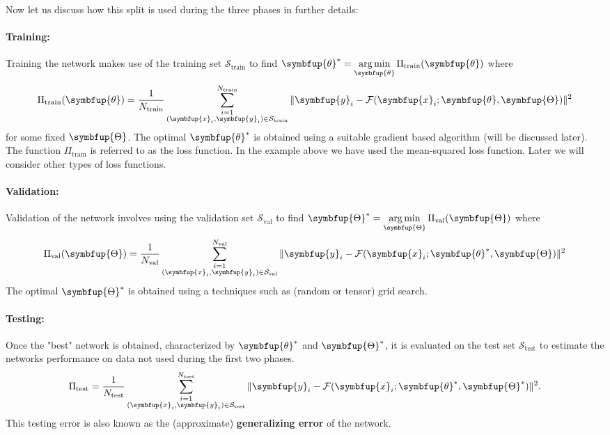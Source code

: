 \documentclass[11pt]{extarticle}
\newcommand{\ds}{\displaystyle}
\newcommand{\vx}{\symbfup{x}}
\newcommand{\vy}{\symbfup{y}}
\theoremstyle{definition}
\newcommand{\btheta}{\symbfup{\theta}}
\newcommand{\Hp}{\symbfup{\Theta}}
\DeclareMathOperator*{\amin}{\rm{\arg \min}}
\begin{document}
Now let us discuss how this split is used during the three phases in further details:

\paragraph{Training:}
Training the network makes use of the training set $\mathcal{S}_{\text{train}}$ to find $\ds\btheta^* = \amin_{\btheta} \Pi_\text{train}(\btheta)$ where
\begin{align*}
  \Pi_\text{train} (\btheta)= \frac{1}{N_\text{train}} \sum_{\substack{i=1\\(\vx_i,\vy_i) \in \mathcal{S}_{\text{train}}}}^{N_\text{train}} \|\vy_i - \mathcal{F}(\vx_i; \btheta, \Hp)\|^2
\end{align*}
for some fixed $\Hp$. The optimal $\btheta^*$ is obtained using a suitable gradient based algorithm (will be discussed later). The function $\Pi_\text{train}$ is referred to as the loss function. In the example above we have used the mean-squared loss function. Later we will consider other types of loss functions. 

\paragraph{Validation:}
Validation of the network involves using the validation set $\mathcal{S}_{\text{val}}$ to find $\ds\Hp^* = \amin_{\Hp} \Pi_\text{val}(\Hp)$ where
\begin{align*}
  \Pi_\text{val} (\Hp)= \frac{1}{N_\text{val}} \sum_{\substack{i=1\\(\vx_i,\vy_i) \in \mathcal{S}_{\text{val}}}}^{N_\text{val}} \|\vy_i - \mathcal{F}(\vx_i; \btheta^*, \Hp)\|^2
\end{align*}
The optimal $\Hp^*$ is obtained using a techniques such as (random or tensor) grid search.

\paragraph{Testing:} Once the "best" network is obtained, characterized by $\btheta^*$ and $\Hp^*$, it is evaluated on the test set $\mathcal{S}_\text{test}$ to estimate the networks performance on data not used during the first two phases. 
\begin{align*}
  \Pi_\text{test} = \frac{1}{N_\text{test}} \sum_{\substack{i=1\\(\vx_i,\vy_i) \in \mathcal{S}_{\text{test}}}}^{N_\text{test}} \|\vy_i - \mathcal{F}(\vx_i; \btheta^*, \Hp^*)\|^2.
\end{align*}
This testing error is also known as the (approximate) \textbf{generalizing error} of the network.
\end{document}
